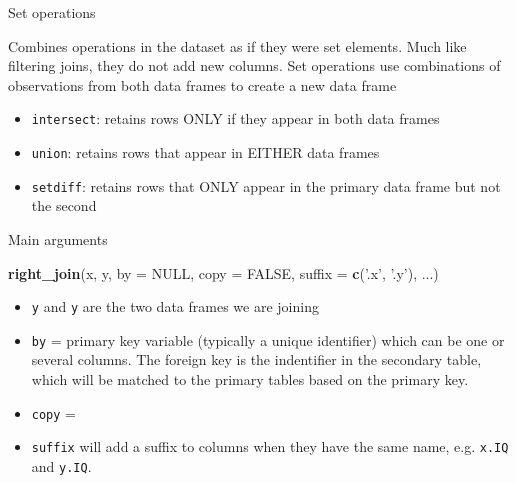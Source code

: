 \documentclass[ignorenonframetext,]{beamer}
\newenvironment{Shaded}{\begin{snugshade}}{\end{snugshade}}
\newcommand{\KeywordTok}[1]{\textcolor[rgb]{0.13,0.29,0.53}{\textbf{#1}}}
\newcommand{\DataTypeTok}[1]{\textcolor[rgb]{0.13,0.29,0.53}{#1}}
\newcommand{\StringTok}[1]{\textcolor[rgb]{0.31,0.60,0.02}{#1}}
\newcommand{\OtherTok}[1]{\textcolor[rgb]{0.56,0.35,0.01}{#1}}
\newcommand{\NormalTok}[1]{#1}
\providecommand{\tightlist}{%
  \setlength{\itemsep}{0pt}\setlength{\parskip}{0pt}}
\begin{document}
\begin{frame}[fragile]{Set operations}

\begin{block}{Combines operations in the dataset as if they were set
elements. Much like filtering joins, they do not add new columns. Set
operations use combinations of observations from both data frames to
create a new data frame}

\begin{itemize}
\tightlist
\item
  \texttt{intersect}: retains rows ONLY if they appear in both data
  frames
\item
  \texttt{union}: retains rows that appear in EITHER data frames
\item
  \texttt{setdiff}: retains rows that ONLY appear in the primary data
  frame but not the second
\end{itemize}

\end{block}

\end{frame}

\begin{frame}[fragile]{Main arguments}

\begin{Shaded}
\begin{Highlighting}[]
\KeywordTok{right_join}\NormalTok{(x, y, }\DataTypeTok{by =} \OtherTok{NULL}\NormalTok{, }\DataTypeTok{copy =} \OtherTok{FALSE}\NormalTok{, }\DataTypeTok{suffix =} \KeywordTok{c}\NormalTok{(}\StringTok{'.x'}\NormalTok{, }\StringTok{'.y'}\NormalTok{), ...)}
\end{Highlighting}
\end{Shaded}

\begin{itemize}
\tightlist
\item
  \texttt{y} and \texttt{y} are the two data frames we are joining
\item
  \texttt{by} = primary key variable (typically a unique identifier)
  which can be one or several columns. The foreign key is the
  indentifier in the secondary table, which will be matched to the
  primary tables based on the primary key.
\item
  \texttt{copy} =
\item
  \texttt{suffix} will add a suffix to columns when they have the same
  name, e.g. \texttt{x.IQ} and \texttt{y.IQ}.
\end{itemize}

\end{frame}
\end{document}
